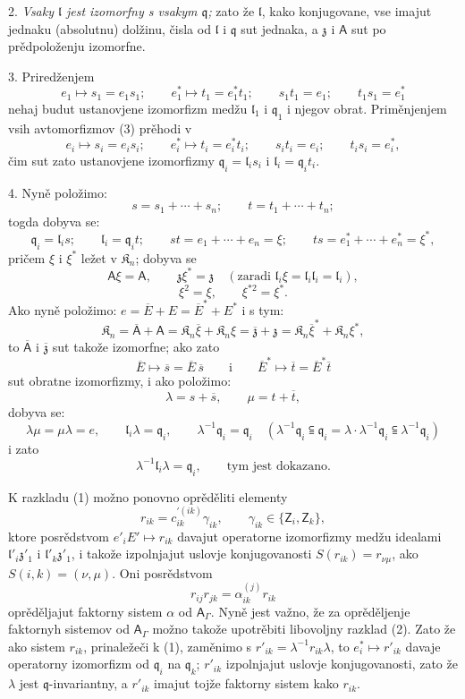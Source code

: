 \documentclass[11pt]{article}
\begin{document}
2. \emph{Vsaky \(\mathfrak l\) jest izomorfny s vsakym \(\mathfrak q\);} zato že \(\mathfrak l\), kako konjugovane, vse imajut jednaku (absolutnu) dolžinu, čisla od \(\mathfrak l\) i \(\mathfrak q\) sut jednaka, a \(\mathfrak z\) i \(\mathsf{A}\) sut po prědpoloženju izomorfne.

3. Priredženjem
\[
\tag{3}
e_1\mapsto s_1=e_1s_1;\qquad
e_1^*\mapsto t_1=e_1^*t_1;\qquad
s_1t_1=e_1;\qquad
t_1s_1=e_1^*
\]
nehaj budut ustanovjene izomorfizm medžu \(\mathfrak l_1\) i \(\mathfrak q_1\) i njegov obrat. Priměnjenjem vsih avtomorfizmov (3) prěhodi v
\[
e_i\mapsto s_i=e_is_i;\qquad
e_i^*\mapsto t_i=e_i^*t_i;\qquad
s_it_i=e_i;\qquad
t_is_i=e_i^*,
\]
čim sut zato ustanovjene izomorfizmy \(\mathfrak q_i=\mathfrak l_is_i\) i \(\mathfrak l_i=\mathfrak q_it_i\).

4. Nyně položimo:
\[
s=s_1+\cdots+s_n;\qquad t=t_1+\cdots+t_n;
\]
togda dobyva se:
\[
\mathfrak q_i=\mathfrak l_is;\qquad
\mathfrak l_i=\mathfrak q_it;\qquad
st=e_1+\cdots+e_n=\xi;\qquad
ts=e_1^*+\cdots+e_n^*=\xi^*,
\]
pričem \(\xi\) i \(\xi^*\) ležet v \(\mathfrak K_n\); dobyva se
\[
\mathsf{A}\xi=\mathsf{A},\qquad \mathfrak z\xi^*=\mathfrak z\quad
(\text{zaradi }\mathfrak l_i\xi=\mathfrak l_i\mathfrak l_i=\mathfrak l_i),
\]
\[
\xi^2=\xi,\qquad \xi^{*2}=\xi^*.
\]
Ako nyně položimo: \(e=\overline E+E=\overline E^*+E^*\) i s tym:
\[
\mathfrak K_n=\overline{\mathsf A}+\mathsf{A}
=\mathfrak K_n\overline\xi+\mathfrak K_n\xi
=\overline{\mathfrak z}+\mathfrak z
=\mathfrak K_n\overline\xi^*+\mathfrak K_n\xi^*,
\]
to \(\overline{\mathsf A}\) i \(\overline{\mathfrak z}\) sut takože izomorfne; ako zato
\[
\overline E\mapsto\overline s=\overline E\,\overline s
\qquad\text{i}\qquad
\overline E^*\mapsto\overline t=\overline E^*\overline t
\]
sut obratne izomorfizmy, i ako položimo:
\[
\lambda=s+\overline s,\qquad \mu=t+\overline t,
\]
dobyva se:
\[
\lambda\mu=\mu\lambda=e,\qquad
\mathfrak l_i\lambda=\mathfrak q_i,\qquad
\lambda^{-1}\mathfrak q_i=\mathfrak q_i
\quad
(\lambda^{-1}\mathfrak q_i\subseteqq\mathfrak q_i
=\lambda\cdot\lambda^{-1}\mathfrak q_i\subseteqq\lambda^{-1}\mathfrak q_i)
\]
i zato
\[
\lambda^{-1}\mathfrak l_i\lambda=\mathfrak q_i,\qquad \text{tym jest dokazano.}
\]

K razkladu (1) možno ponovno oprěděliti elementy
\[
r_{ik}=c_{ik}^{\prime(ik)}\gamma_{ik},\qquad \gamma_{ik}\in\{\mathsf{Z}_i,\mathsf{Z}_k\},
\]
ktore posrědstvom \(e'_iE'\mapsto r_{ik}\) davajut operatorne izomorfizmy medžu idealami \(\mathfrak l'_i\mathfrak z'_1\) i \(\mathfrak l'_k\mathfrak z'_1\), i takože izpolnjajut uslovje konjugovanosti \(S(r_{ik})=r_{\nu\mu}\), ako \(S(i,k)=(\nu,\mu)\). Oni posrědstvom
\[
r_{ij}r_{jk}=\alpha_{ik}^{(j)}r_{ik}
\]
oprěděljajut faktorny sistem \(\alpha\) od \(\mathsf{A}_\Gamma\). Nyně jest važno, že za oprěděljenje faktornyh sistemov od \(\mathsf{A}_\Gamma\) možno takože upotrěbiti libovoljny razklad (2). Zato že ako sistem \(r_{ik}\), prinaležeči k (1), zaměnimo s \(r'_{ik}=\lambda^{-1}r_{ik}\lambda\), to \(e_i^*\mapsto r'_{ik}\) davaje operatorny izomorfizm od \(\mathfrak q_i\) na \(\mathfrak q_k\); \(r'_{ik}\) izpolnjajut uslovje konjugovanosti, zato že \(\lambda\) jest \(\mathfrak q\)-invariantny, a \(r'_{ik}\) imajut tojže faktorny sistem kako \(r_{ik}\).
\end{document}
